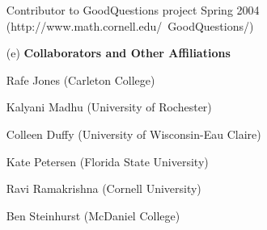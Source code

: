 \documentclass[11pt]{article}
\begin{document}
\begin{enumerate}[leftmargin=*]
Contributor to GoodQuestions project \hfill Spring 2004\\
(http://www.math.cornell.edu/~GoodQuestions/)


\item[(e)] \textbf{Collaborators and Other Affiliations} 
 
Rafe Jones (Carleton College)

Kalyani Madhu (University of Rochester)

Colleen Duffy (University of Wisconsin-Eau Claire)

Kate Petersen (Florida State University)

Ravi Ramakrishna (Cornell University)

Ben Steinhurst (McDaniel College)

\end{enumerate}
\end{document}
